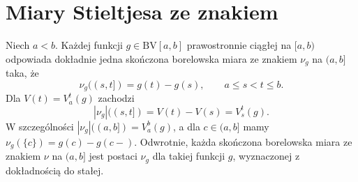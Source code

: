 \section{Miary Stieltjesa ze znakiem}

\begin{twierdzenie}
\label{it:thm:stieltjes-signed-bv}
Niech $a<b$. Każdej funkcji $g\in\mathrm{BV}[a,b]$
prawostronnie ciągłej na $[a,b)$ odpowiada dokładnie
jedna skończona borelowska miara ze znakiem $\nu_g$
na $(a,b]$ taka, że
\[
 \nu_g((s,t])=g(t)-g(s),\qquad a\le s<t\le b.
\]
Dla $V(t)=V_a^t(g)$ zachodzi
\[
 |\nu_g|((s,t])=V(t)-V(s)=V_s^t(g).
\]
W szczególności $|\nu_g|((a,b])=V_a^b(g)$,
a dla $c\in(a,b]$ mamy
$\nu_g(\{c\})=g(c)-g(c-)$.
Odwrotnie, każda skończona borelowska miara ze znakiem
$\nu$ na $(a,b]$ jest postaci $\nu_g$ dla takiej
funkcji $g$, wyznaczonej z dokładnością do stałej.
\end{twierdzenie}
